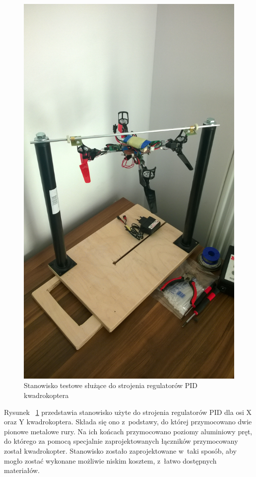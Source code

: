 \begin{figure}[H]
	\centering
	\includegraphics[scale=0.15]{Pictures/QuadroTestStation.jpg}
	\caption[Stanowisko testowe służące do strojenia regulatorów PID kwadrokoptera]{Stanowisko testowe służące do strojenia regulatorów PID kwadrokoptera}
	\label{fig:QuadroTestStation}
\end{figure}

Rysunek ~\ref{fig:QuadroTestStation} przedstawia stanowisko użyte do strojenia regulatorów PID dla osi X oraz Y kwadrokoptera. Składa się ono z~podstawy, do której przymocowano dwie pionowe metalowe rury. Na ich końcach przymocowano poziomy aluminiowy pręt, do którego za pomocą specjalnie zaprojektowanych łączników przymocowany został kwadrokopter. Stanowisko zostało zaprojektowane w~taki sposób, aby mogło zostać wykonane możliwie niskim kosztem, z~łatwo dostępnych materiałów.  

